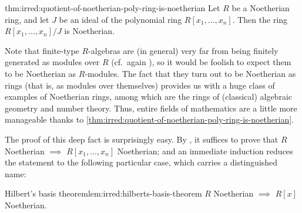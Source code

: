 \begin{thm}{}{thm:irred:quotient-of-noetherian-poly-ring-is-noetherian}
  Let $R$ be a Noetherian ring, and let $J$ be an ideal of the
  polynomial ring $R[x_1, \dots, x_n]$. Then the ring
  $R[x_1, \dots, x_n]/J$ is Noetherian.
\end{thm}

Note that finite-type $R$-algebras are (in general) very far from
being finitely generated as modules over $R$ (cf.\ again
), so it would
be foolish to expect them to be Noetherian as $R$-modules. The fact
that they turn out to be Noetherian as rings (that is, as modules over
themselves) provides us with a huge class of examples of Noetherian
rings, among which are the rings of (classical) algebraic geometry and
number theory. Thus, entire fields of mathematics are a little more
manageable thanks to \cref{thm:irred:quotient-of-noetherian-poly-ring-is-noetherian}.

The proof of this deep fact is surprisingly easy. By
, it suffices to prove that
$R$ Noetherian $\implies$ $R[x_1, \dots, x_n]$ Noetherian; and an
immediate induction reduces the statement to the following particular
case, which carries a distinguished name:
\begin{lem}{Hilbert's basis theorem}{lem:irred:hilberts-basis-theorem}
  $R$ Noetherian $\implies$ $R[x]$ Noetherian.
\end{lem}

